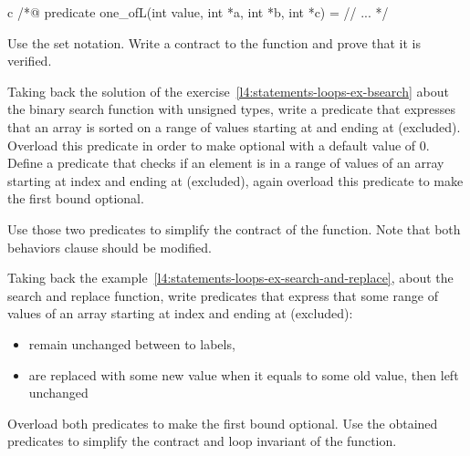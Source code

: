 \begin{CodeBlock}{c}
/*@
  predicate one_of{L}(int value, int *a, int *b, int *c) =
    // ...
*/
\end{CodeBlock}

Use the set notation. Write a contract to the function and prove that it is
verified.


\label{l4:acsl-properties-predicates-ex-bsearch}


Taking back the solution of the
exercise~\ref{l4:statements-loops-ex-bsearch} about the binary search function
with unsigned types, write a predicate that expresses that an array is sorted on
a range of values starting at  and ending at 
(excluded). Overload this predicate in order to make  optional
with a default value of $0$. Define a predicate that checks if an element is in
a range of values of an array starting at index  and ending at
 (excluded), again overload this predicate to make the first
bound optional.

Use those two predicates to simplify the contract of the function. Note that
both behaviors  clause should be modified.





Taking back the example~\ref{l4:statements-loops-ex-search-and-replace}, about
the search and replace function, write predicates that express that some range
of values of an array starting at index  and ending at
 (excluded):

\begin{itemize}
\item remain unchanged between to labels,
\item are replaced with some new value when it equals to some old value, then
  left unchanged
\end{itemize}

Overload both predicates to make the first bound optional. Use the obtained
predicates to simplify the contract and loop invariant of the function.
